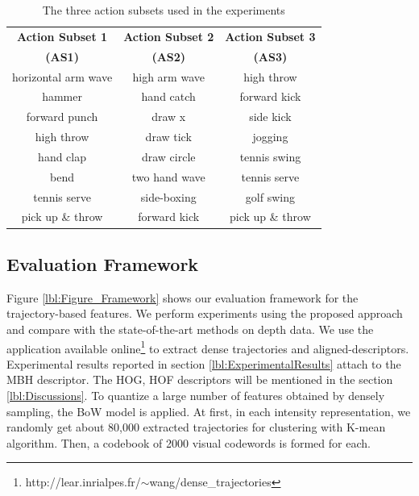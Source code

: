 \documentclass[review]{elsarticle}
\begin{document}
\begin{table}
	\begin{center}
		\begin{tabular}{c|c|c}
		
		{\bf Action Subset 1} & {\bf Action Subset 2} & {\bf Action Subset 3} \\
		{\bf(AS1)} & {\bf(AS2)} & {\bf(AS3)} \\
		\hline
		horizontal arm wave &  high arm wave &     high throw \\
		
		        hammer &     hand catch &   forward kick \\
		
		 forward punch &         draw x &      side kick \\
		
		    high throw &      draw tick &        jogging \\
		
		     hand clap &    draw circle &   tennis swing \\
		
		          bend &  two hand wave &   tennis serve \\
		
		  tennis serve &    side-boxing &     golf swing \\
		
		pick up \& throw &   forward kick & pick up \& throw \\
		
		\end{tabular}
	\end{center}
	\caption{\label{lbl:3ActionSubsets}The three action subsets used in the experiments}
\end{table}

\subsection{Evaluation Framework}

Figure \ref{lbl:Figure_Framework} shows our evaluation framework for the trajectory-based features. We perform experiments using the proposed approach and compare with the state-of-the-art methods on depth data. We use the application available online\footnote{http://lear.inrialpes.fr/$\sim$wang/dense\_trajectories} to extract dense trajectories and aligned-descriptors. Experimental results reported in section \ref{lbl:ExperimentalResults} attach to the MBH descriptor. The HOG, HOF descriptors will be mentioned in the section \ref{lbl:Discussions}. To quantize a large number of features obtained by densely sampling, the BoW model is applied. At first, in each intensity representation, we randomly get about 80,000 extracted trajectories for clustering with K-mean algorithm. Then, a codebook of 2000 visual codewords is formed for each.
\end{document}
